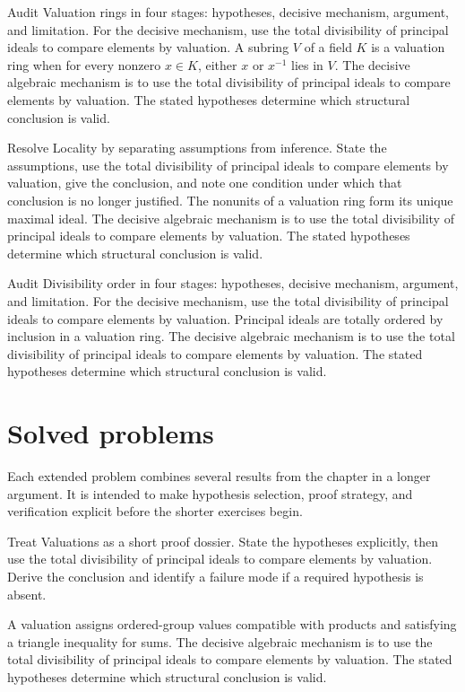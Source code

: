 \begin{example}\label{ex:v21-worked-02}
Audit Valuation rings in four stages: hypotheses, decisive mechanism, argument, and limitation. For the decisive mechanism, use the total divisibility of principal ideals to compare elements by valuation. A subring $V$ of a field $K$ is a valuation ring when for every nonzero $x\in K$, either $x$ or $x^{-1}$ lies in $V$. The decisive algebraic mechanism is to use the total divisibility of principal ideals to compare elements by valuation. The stated hypotheses determine which structural conclusion is valid.
\end{example}

\begin{example}\label{ex:v21-worked-03}
Resolve Locality by separating assumptions from inference. State the assumptions, use the total divisibility of principal ideals to compare elements by valuation, give the conclusion, and note one condition under which that conclusion is no longer justified. The nonunits of a valuation ring form its unique maximal ideal. The decisive algebraic mechanism is to use the total divisibility of principal ideals to compare elements by valuation. The stated hypotheses determine which structural conclusion is valid.
\end{example}

\begin{example}\label{ex:v21-worked-04}
Audit Divisibility order in four stages: hypotheses, decisive mechanism, argument, and limitation. For the decisive mechanism, use the total divisibility of principal ideals to compare elements by valuation. Principal ideals are totally ordered by inclusion in a valuation ring. The decisive algebraic mechanism is to use the total divisibility of principal ideals to compare elements by valuation. The stated hypotheses determine which structural conclusion is valid.
\end{example}

\section{Solved problems}
Each extended problem combines several results from the chapter in a longer argument. It is intended to make hypothesis selection, proof strategy, and verification explicit before the shorter exercises begin.

\begin{problem}\label{prob:v21-problem-01}
Treat Valuations as a short proof dossier. State the hypotheses explicitly, then use the total divisibility of principal ideals to compare elements by valuation. Derive the conclusion and identify a failure mode if a required hypothesis is absent.
\end{problem}
\begin{solution}
A valuation assigns ordered-group values compatible with products and satisfying a triangle inequality for sums. The decisive algebraic mechanism is to use the total divisibility of principal ideals to compare elements by valuation. The stated hypotheses determine which structural conclusion is valid.
\end{solution}

